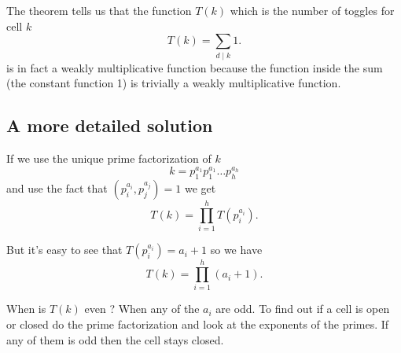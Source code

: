 The theorem tells us that the function $T(k)$ which is the number of toggles for cell $k$
\[	 
	T(k) = \sum_{d \mid k} 1.
\]
is in fact a weakly multiplicative function because the function inside the sum (the constant function 1) is trivially a weakly multiplicative function.

\subsection{A more detailed solution}

If we use the unique prime factorization of $k$
\[
	k = p_1^{a_1} p_1^{a_1} \dots p_h^{a_h}
\]
and use the fact that $(p_i^{a_i}, p_j^{a_j}) = 1$ we get
\[
	T(k) = \prod_{i  = 1}^h T(p_i^{a_i}).
\]		 

But it's easy to see that $T(p_i^{a_i}) = a_i + 1$ so we have
\[
	T(k) = \prod_{i  = 1}^h (a_i + 1).
\]

When is $T(k)$ even ? When any of the $a_i$ are odd. To find out if a cell is open or closed do the prime factorization and look at the exponents of the primes. If any of them is odd then the cell stays closed.	


